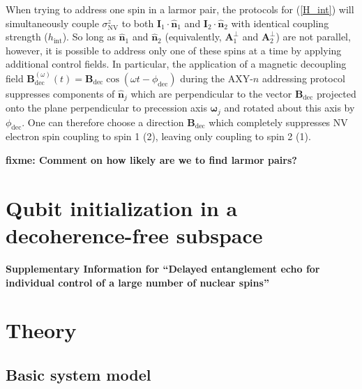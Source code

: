 \documentclass[twocolumn]{revtex4-1}
\renewcommand{\t}{\text} %
\newcommand{\p}[1]{\left(#1\right)} %
\renewcommand{\v}{\bm} %
\newcommand{\uv}[1]{\hat{\v{#1}}} %
\renewcommand{\c}{\cdot} %
\newcommand{\NV}{\t{NV}}
\newcommand{\fixme}[1]{{\bf \color{red} fixme: #1}}
\begin{document}
When trying to address one spin in a larmor pair, the protocols for
(\ref{H_int}) will simultaneously couple $\sigma_\NV^z$ to both
$\v I_1\c\uv n_1$ and $\v I_2\c\uv n_2$ with identical coupling
strength ($h_\t{int}$). So long as $\uv n_1$ and $\uv n_2$
(equivalently, $\v A_1^\perp$ and $\v A_2^\perp$) are not parallel,
however, it is possible to address only one of these spins at a time
by applying additional control fields. In particular, the application
of a magnetic decoupling field
$\v B_\t{dec}^{\p\omega}\p{t}=\v B_\t{dec}\cos\p{\omega
  t-\phi_\t{dec}}$ during the AXY-$n$ addressing protocol suppresses
components of $\uv n_j$ which are perpendicular to the vector
$\v B_\t{dec}$ projected onto the plane perpendicular to precession
axis $\v\omega_j$ and rotated about this axis by $\phi_\t{dec}$. One
can therefore choose a direction $\v B_\t{dec}$ which completely
suppresses NV electron spin coupling to spin 1 (2), leaving only
coupling to spin 2 (1).

\fixme{Comment on how likely are we to find larmor pairs?}

\section{Qubit initialization in a decoherence-free subspace}






\pagebreak
\clearpage
\widetext
\begin{center}
  \textbf{\large Supplementary Information for ``Delayed entanglement
    echo for individual control of a large number of nuclear spins''}
\end{center}
\setcounter{equation}{0} \setcounter{figure}{0} \setcounter{table}{0}
\setcounter{page}{1} \makeatletter
\renewcommand{\theequation}{S\arabic{equation}}
\renewcommand{\thefigure}{S\arabic{figure}}
\renewcommand{\bibnumfmt}[1]{[S#1]}
\renewcommand{\citenumfont}[1]{S#1}

\tableofcontents{}

\section{Theory}

\subsection{Basic system model}
\end{document}
